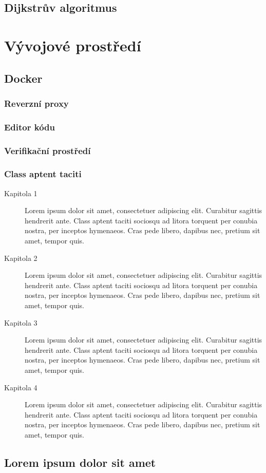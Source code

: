\section{Dijkstrův algoritmus}

\chapter{Vývojové prostředí}

\section{Docker}

\subsection{Reverzní proxy}

\subsection{Editor kódu}

\subsection{Verifikační prostředí}


\subsection{Class aptent taciti}

\lipsum[2-3]

\begin{description}
\item[Kapitola 1] Lorem ipsum dolor sit amet, consectetuer adipiscing elit. Curabitur sagittis hendrerit ante. Class aptent taciti sociosqu ad litora torquent per conubia nostra, per inceptos hymenaeos. Cras pede libero, dapibus nec, pretium sit amet, tempor quis.

\item[Kapitola 2] Lorem ipsum dolor sit amet, consectetuer adipiscing elit. Curabitur sagittis hendrerit ante. Class aptent taciti sociosqu ad litora torquent per conubia nostra, per inceptos hymenaeos. Cras pede libero, dapibus nec, pretium sit amet, tempor quis.

\item[Kapitola 3] Lorem ipsum dolor sit amet, consectetuer adipiscing elit. Curabitur sagittis hendrerit ante. Class aptent taciti sociosqu ad litora torquent per conubia nostra, per inceptos hymenaeos. Cras pede libero, dapibus nec, pretium sit amet, tempor quis.

\item[Kapitola 4] Lorem ipsum dolor sit amet, consectetuer adipiscing elit. Curabitur sagittis hendrerit ante. Class aptent taciti sociosqu ad litora torquent per conubia nostra, per inceptos hymenaeos. Cras pede libero, dapibus nec, pretium sit amet, tempor quis.
\end{description}

\lipsum[2]

\section{Lorem ipsum dolor sit amet}

\lipsum[3-5]
